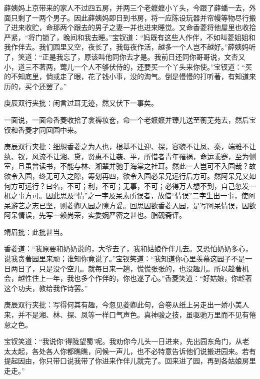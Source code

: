 \begin{parag}
    薛姨妈上京带来的家人不过四五房，并两三个老嬷嬷小丫头，今跟了薛蟠一去，外面只剩了一两个男子。因此薛姨妈即日到书房，将一应陈设玩器并帘幔等物尽行搬了进来收贮，命那两个跟去的男子之妻一并也进来睡觉。又命香菱将他屋里也收拾严紧，“将门锁了，晚间和我去睡。”宝钗道：“妈既有这些人作伴，不如叫菱姐姐和我作伴去。我们园里又空，夜长了，我每夜作活，越多一个人岂不越好。”薛姨妈听了，笑道：“正是我忘了，原该叫他同你去才是。我前日还同你哥哥说，文杏又小，道三不著两，莺儿一个人不够伏侍的，还要买一个丫头来你使。”宝钗道：“买的不知底里，倘或走了眼，花了钱小事，没的淘气。倒是慢慢的打听著，有知道来历的，买个还罢了。”\begin{note}庚辰双行夹批：闲言过耳无迹，然又伏下一事矣。\end{note}一面说，一面命香菱收拾了衾褥妆奁，命一个老嬷嬷并臻儿送至蘅芜苑去，然后宝钗和香菱才同回园中来。\begin{note}庚辰双行夹批：细想香菱之为人也，根基不让迎、探，容貌不让凤、秦，端雅不让纨、钗，风流不让湘、黛，贤惠不让袭、平，所惜者青年罹祸，命运乖蹇，至为侧室，且虽曾读书，不能与林、湘辈并驰于海棠之社耳。然此一人岂可不入园哉？故欲令入园，终无可入之隙，筹划再四，欲令入园必呆兄远行后方可。然阿呆兄又如何方可远行？曰名，不可；利，不可；无事，不可；必得万人想不到，自己忽发一机之事方可。因此思及“情”之一字及呆素所误者，故借“情误”二字生出一事，使阿呆游艺之志已坚，则菱卿入园之隙方妥。回思因欲香菱入园，是写阿呆情误，因欲阿呆情误，先写一赖尚荣，实委婉严密之甚也。脂砚斋评。\end{note}\begin{note}靖眉批：此批甚当。\end{note}
\end{parag}


\begin{parag}
    香菱道：“我原要和奶奶说的，大爷去了，我和姑娘作伴儿去。又恐怕奶奶多心，说我贪著园里来顽；谁知你竟说了。”宝钗笑道：“我知道你心里羡慕这园子不是一日两日了，只是没个空儿。就每日来一趟，慌慌张张的，也没趣儿。所以趁著机会，越性住上一年，我也多个作伴的，你也遂了心。”香菱笑道：“好姑娘，你趁著这个功夫，教给我作诗罢。”\begin{note}庚辰双行夹批：写得何其有趣，今忽见菱卿此句，合卷从纸上另走出一娇小美人来，并不是湘、林、探、凤等一样口气声色。真神骏之技，虽驱驰万里而不见有倦怠之色。\end{note}宝钗笑道：“我说你‘得陇望蜀’呢。我劝你今儿头一日进来，先出园东角门，从老太太起，各处各人你都瞧瞧，问候一声儿，也不必特意告诉他们说搬进园来。若有提起因由，你只带口说我带了你进来作伴儿就完了。回来进了园，再到各姑娘房里走走。”
\end{parag}


